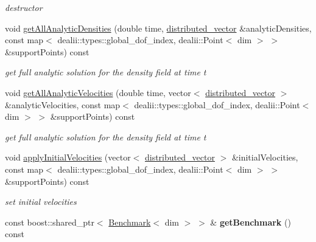 \begin{DoxyCompactItemize}
\begin{DoxyCompactList}\small\item\em destructor \item\end{DoxyCompactList}\item 
\hypertarget{classnatrium_1_1BenchmarkCFDSolver_a486d464112256436c1c3300b28519cbb}{
void \hyperlink{classnatrium_1_1BenchmarkCFDSolver_a486d464112256436c1c3300b28519cbb}{getAllAnalyticDensities} (double time, \hyperlink{namespacenatrium_a903d2b92917f582f2ff05f52160ab811}{distributed\_\-vector} \&analyticDensities, const map$<$ dealii::types::global\_\-dof\_\-index, dealii::Point$<$ dim $>$ $>$ \&supportPoints) const }
\label{classnatrium_1_1BenchmarkCFDSolver_a486d464112256436c1c3300b28519cbb}

\begin{DoxyCompactList}\small\item\em get full analytic solution for the density field at time t \item\end{DoxyCompactList}\item 
\hypertarget{classnatrium_1_1BenchmarkCFDSolver_aebef5814f8c44ab8d0029114b5998cff}{
void \hyperlink{classnatrium_1_1BenchmarkCFDSolver_aebef5814f8c44ab8d0029114b5998cff}{getAllAnalyticVelocities} (double time, vector$<$ \hyperlink{namespacenatrium_a903d2b92917f582f2ff05f52160ab811}{distributed\_\-vector} $>$ \&analyticVelocities, const map$<$ dealii::types::global\_\-dof\_\-index, dealii::Point$<$ dim $>$ $>$ \&supportPoints) const }
\label{classnatrium_1_1BenchmarkCFDSolver_aebef5814f8c44ab8d0029114b5998cff}

\begin{DoxyCompactList}\small\item\em get full analytic solution for the density field at time t \item\end{DoxyCompactList}\item 
void \hyperlink{classnatrium_1_1BenchmarkCFDSolver_a7883dcfd4469ae65ae62cad09ae5d160}{applyInitialVelocities} (vector$<$ \hyperlink{namespacenatrium_a903d2b92917f582f2ff05f52160ab811}{distributed\_\-vector} $>$ \&initialVelocities, const map$<$ dealii::types::global\_\-dof\_\-index, dealii::Point$<$ dim $>$ $>$ \&supportPoints) const 
\begin{DoxyCompactList}\small\item\em set initial velocities \item\end{DoxyCompactList}\item 
\hypertarget{classnatrium_1_1BenchmarkCFDSolver_a767bb620c883abad0091a9e68aee4491}{
const boost::shared\_\-ptr$<$ \hyperlink{classnatrium_1_1Benchmark}{Benchmark}$<$ dim $>$ $>$ \& {\bfseries getBenchmark} () const }
\label{classnatrium_1_1BenchmarkCFDSolver_a767bb620c883abad0091a9e68aee4491}


\end{DoxyCompactItemize}
